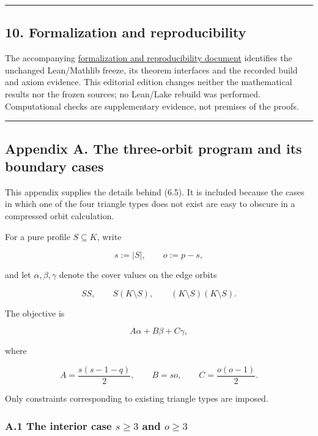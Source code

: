 \documentclass[english,11pt,a4paper]{article}
\begin{document}
\begin{center}\rule{0.5\linewidth}{0.5pt}\end{center}

\subsection{10. Formalization and
reproducibility}\label{formalization-and-reproducibility}

The accompanying
\href{https://github.com/jtraverso/erdos-81-chordal-clique-partitions/blob/main/preprints/PAPER_I/05_formalization/FORMALIZATION_COMPANION_v1.4_en.pdf}{formalization
and reproducibility document} identifies the unchanged Lean/Mathlib
freeze, its theorem interfaces and the recorded build and axiom
evidence. This editorial edition changes neither the mathematical
results nor the frozen sources; no Lean/Lake rebuild was performed.
Computational checks are supplementary evidence, not premises of the
proofs.

\begin{center}\rule{0.5\linewidth}{0.5pt}\end{center}

\subsection{Appendix A. The three-orbit program and its boundary
cases}\label{appendix-a.-the-three-orbit-program-and-its-boundary-cases}

This appendix supplies the details behind (6.5). It is included because
the cases in which one of the four triangle types does not exist are
easy to obscure in a compressed orbit calculation.

For a pure profile \(S\subseteq K\), write

\[
s:=|S|,
\qquad
o:=p-s,
\]

and let \(\alpha,\beta,\gamma\) denote the cover values on the edge
orbits

\[
SS,\qquad S(K\setminus S),\qquad (K\setminus S)(K\setminus S).
\]

The objective is

\[
A\alpha+B\beta+C\gamma,
\]

where

\[
A=\frac{s(s-1-q)}2,
\qquad
B=so,
\qquad
C=\frac{o(o-1)}2.
\]

Only constraints corresponding to existing triangle types are imposed.

\subsubsection{\texorpdfstring{A.1 The interior case \(s\ge3\) and
\(o\ge3\)}{A.1 The interior case s\textbackslash ge3 and o\textbackslash ge3}}\label{a.1-the-interior-case-sge3-and-oge3}
\end{document}
